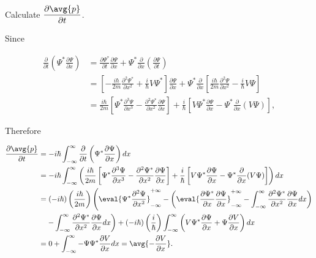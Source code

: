 \documentclass[a4paper,12pt]{report}
\begin{document}
{Calculate \(\displaystyle \frac{\partial \avg{p} }{\partial t} \).}
{Since 
		
\begin{equation}
	\begin{aligned}
		\frac{\partial}{\partial t}\left(\Psi^* \frac{\partial \Psi}{\partial x}\right) & =\frac{\partial \Psi^*}{\partial t} \frac{\partial \Psi}{\partial x}+\Psi^* \frac{\partial}{\partial x}\left(\frac{\partial \Psi}{\partial t}\right) \\
		& =\left[-\frac{i \hbar}{2 m} \frac{\partial^2 \Psi^*}{\partial x^2}+\frac{i}{\hbar} V \Psi^*\right] \frac{\partial \Psi}{\partial x}+\Psi^* \frac{\partial}{\partial x}\left[\frac{i \hbar}{2 m} \frac{\partial^2 \Psi}{\partial x^2}-\frac{i}{\hbar} V \Psi\right] \\
		& =\frac{i \hbar}{2 m}\left[\Psi^* \frac{\partial^3 \Psi}{\partial x^3}-\frac{\partial^2 \Psi^*}{\partial x^2} \frac{\partial \Psi}{\partial x}\right]+\frac{i}{\hbar}\left[V \Psi^* \frac{\partial \Psi}{\partial x}-\Psi^* \frac{\partial}{\partial x}(V \Psi)\right],
	\end{aligned}
\end{equation}
		
Therefore

\begin{equation}
  \begin{aligned}
      \frac{\partial \avg{p}}{\partial t} &= -i\hbar \int_{-\infty}^{\infty} \frac{\partial}{\partial t} \left(\Psi^* \frac{\partial \Psi}{\partial x} \right) dx \\ 
      &= -i\hbar \int_{-\infty}^{\infty} \left( \frac{i\hbar}{2m} \left[ \Psi^* \frac{\partial^3 \Psi}{\partial x^3} - \frac{\partial^2 \Psi^*}{\partial x^2} \frac{\partial \Psi}{\partial x} \right] 
      + \frac{i}{\hbar} \left[ V \Psi^* \frac{\partial \Psi}{\partial x} - \Psi^* \frac{\partial}{\partial x}(V \Psi) \right] \right) dx \\ 
      &= (-i\hbar) \left( \frac{i\hbar}{2m} \right) 
      \left( \eval{\Psi^* \frac{\partial^2 \Psi}{\partial x^2}}_{-\infty}^{+\infty} 
      - \left( \eval{\frac{\partial \Psi^*}{\partial x} \frac{\partial \Psi}{\partial x}}_{-\infty}^{+\infty} 
      - \int_{-\infty}^{\infty} \frac{\partial^2 \Psi^*}{\partial x^2} \frac{\partial \Psi}{\partial x} dx \right) \right. \\ 
      & \quad \left. - \int_{-\infty}^{\infty} \frac{\partial^2 \Psi^*}{\partial x^2} \frac{\partial \Psi}{\partial x} dx \right) 
      + (-i\hbar) \left( \frac{i}{\hbar} \right) 
      \int_{-\infty}^{\infty} \left( V \Psi^* \frac{\partial \Psi}{\partial x} + \Psi \frac{\partial V}{\partial x} \right) dx \\ 
      &= 0 + \int_{-\infty}^{\infty} -\Psi \Psi^* \frac{\partial V}{\partial x} dx = \avg{-\frac{\partial V}{\partial x}}.
  \end{aligned}
  \end{equation}
	
}
\end{document}
